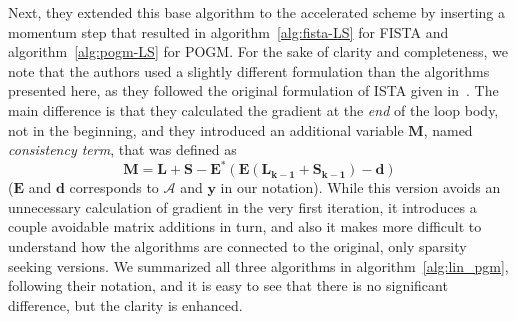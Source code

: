 Next, they extended this base algorithm to the accelerated scheme by inserting a momentum step that resulted in algorithm~\ref{alg:fista-LS} for FISTA and algorithm~\ref{alg:pogm-LS} for POGM. For the sake of clarity and completeness, we note that the authors used a slightly different formulation than the algorithms presented here, as they followed the original formulation of ISTA given in~\cite{otazo_lowrank_2015}. The main difference is that they calculated the gradient at the \textit{end} of the loop body, not in the beginning, and they introduced an additional variable $\mathbf{M}$, named \textit{consistency term}, that was defined as 
\[\mathbf{M = L + S - \mathbf{E}^*(\mathbf{E} (\mathbf{L_{k-1} + S_{k-1}}) - \mathbf{d})}\] ($\mathbf{E}$ and $\mathbf{d}$ corresponds to $\mathcal{A}$ and $\mathbf{y}$ in our notation). While this version avoids an unnecessary calculation of gradient in the very first iteration, it introduces a couple avoidable matrix additions in turn, and also it makes more difficult to understand how the algorithms are connected to the original, only sparsity seeking versions. We summarized all three algorithms in algorithm~\ref{alg:lin_pgm}, following their notation, and it is easy to see that there is no significant difference, but the clarity is enhanced.

